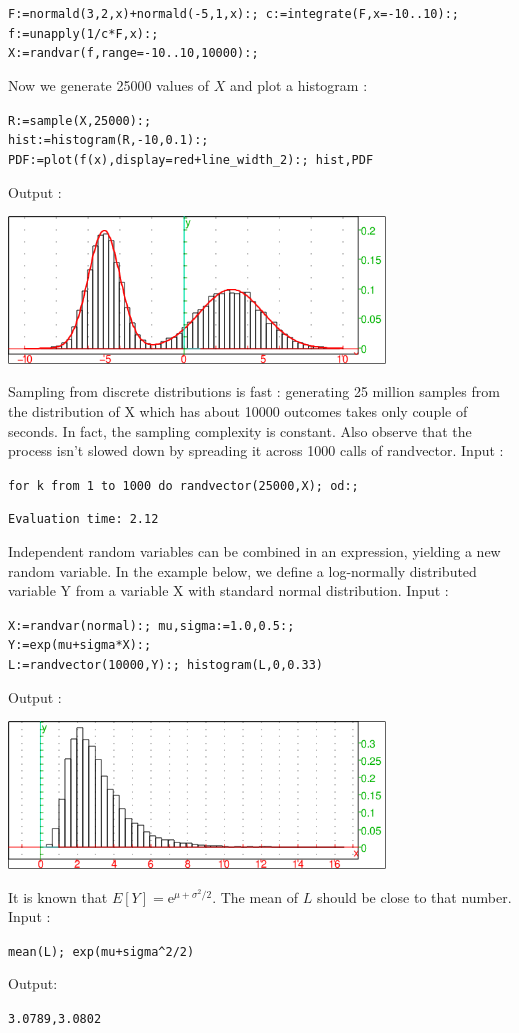 \begin{center}
  \tt F:=normald(3,2,x)+normald(-5,1,x):; c:=integrate(F,x=-10..10):;\\
  f:=unapply(1/c*F,x):;\\
  X:=randvar(f,range=-10..10,10000):;
\end{center}
Now we generate 25000 values of $X$ and plot a histogram :
\begin{center}
  \tt R:=sample(X,25000):;\\
  hist:=histogram(R,-10,0.1):;\\
  PDF:=plot(f(x),display=red+line\_width\_2):;
  hist,PDF
\end{center}
Output :
\begin{center}
  \includegraphics[width=0.75\textwidth]{random_hist2.png}
\end{center}
Sampling from discrete distributions is fast : generating 25 million samples from the distribution of X which
has about 10000 outcomes takes only couple of seconds. In fact, the sampling complexity is constant.
Also observe that the process isn't slowed down by spreading it across 1000 calls of randvector. Input :
\begin{center}
  \tt for k from 1 to 1000 do randvector(25000,X); od:;
\end{center}
{\tt Evaluation time: 2.12}

Independent random variables can be combined in an expression, yielding a new random variable.
In the example below, we define a log-normally distributed variable Y from a variable X with standard
normal distribution. Input :
\begin{center}
  \tt X:=randvar(normal):; mu,sigma:=1.0,0.5:;\\Y:=exp(mu+sigma*X):;\\L:=randvector(10000,Y):; histogram(L,0,0.33)
\end{center}
Output :
\begin{center}
  \includegraphics[width=0.75\textwidth]{random_hist3.png}
\end{center}
It is known that $E[Y]=\mathrm{e}^{\mu+\sigma^2/2}$. The mean of $L$ should be close to that number. Input :
\begin{center}
  \tt mean(L); exp(mu+sigma\verb|^|2/2)
\end{center}
Output:
\begin{center}
  \tt 3.0789,3.0802
\end{center}

